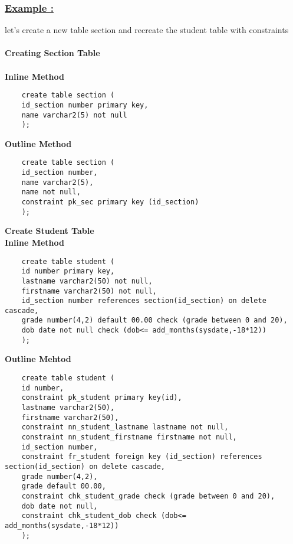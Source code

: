 \subsubsection*{\underline{Example :}}
let's create a new table section and recreate the student table with constraints\\\\
\textbf{Creating Section Table}\\\\
\textbf{Inline Method}
\begin{lstlisting}
    create table section (
    id_section number primary key,
    name varchar2(5) not null
    );
\end{lstlisting}
\textbf{Outline Method}
\begin{lstlisting}
    create table section (
    id_section number,
    name varchar2(5),
    name not null,
    constraint pk_sec primary key (id_section)
    );
\end{lstlisting}

\textbf{Create Student Table}\\
\textbf{Inline Method}
\begin{lstlisting}
    create table student (
    id number primary key,
    lastname varchar2(50) not null,
    firstname varchar2(50) not null,
    id_section number references section(id_section) on delete cascade,
    grade number(4,2) default 00.00 check (grade between 0 and 20),
    dob date not null check (dob<= add_months(sysdate,-18*12))
    );
\end{lstlisting}

\textbf{Outline Mehtod}
\begin{lstlisting}
    create table student (
    id number,
    constraint pk_student primary key(id),
    lastname varchar2(50),
    firstname varchar2(50),
    constraint nn_student_lastname lastname not null,
    constraint nn_student_firstname firstname not null,
    id_section number,
    constraint fr_student foreign key (id_section) references section(id_section) on delete cascade,
    grade number(4,2),
    grade default 00.00,
    constraint chk_student_grade check (grade between 0 and 20),
    dob date not null,
    constraint chk_student_dob check (dob<= add_months(sysdate,-18*12))
    );
\end{lstlisting}

